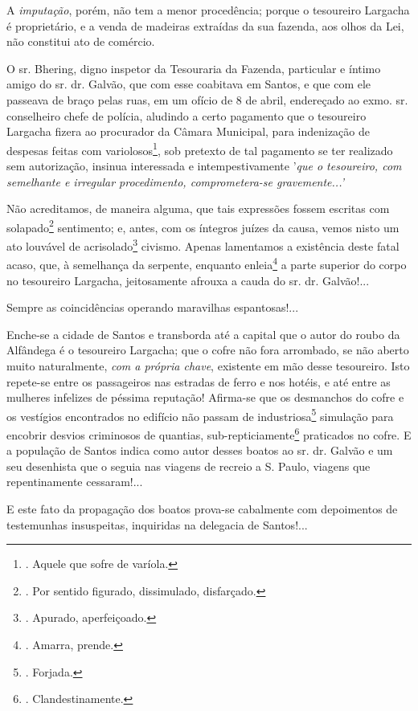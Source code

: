 A \emph{imputação}, porém, não tem a menor procedência; porque o
tesoureiro Largacha é proprietário, e a venda de madeiras extraídas da
sua fazenda, aos olhos da Lei, não constitui ato de comércio.

O sr. Bhering, digno inspetor da Tesouraria da Fazenda, particular e
íntimo amigo do sr. dr. Galvão, que com esse coabitava em Santos, e que
com ele passeava de braço pelas ruas, em um ofício de 8 de abril,
endereçado ao exmo. sr. conselheiro chefe de polícia, aludindo a certo
pagamento que o tesoureiro Largacha fizera ao procurador da Câmara
Municipal, para indenização de despesas feitas com variolosos\footnote{.
  Aquele que sofre de varíola.}, sob pretexto de tal pagamento se ter
realizado sem autorização, insinua interessada e intempestivamente
'\emph{que o tesoureiro, com semelhante e irregular procedimento,
comprometera-se gravemente...'}

Não acreditamos, de maneira alguma, que tais expressões fossem escritas
com solapado\footnote{. Por sentido figurado, dissimulado, disfarçado.}
sentimento; e, antes, com os íntegros juízes da causa, vemos nisto um
ato louvável de acrisolado\footnote{. Apurado, aperfeiçoado.} civismo.
Apenas lamentamos a existência deste fatal acaso, que, à semelhança da
serpente, enquanto enleia\footnote{. Amarra, prende.} a parte superior
do corpo no tesoureiro Largacha, jeitosamente afrouxa a cauda do sr. dr.
Galvão!...

Sempre as coincidências operando maravilhas espantosas!...

Enche-se a cidade de Santos e transborda até a capital que o autor do
roubo da Alfândega é o tesoureiro Largacha; que o cofre não fora
arrombado, se não aberto muito naturalmente, \emph{com a própria chave},
existente em mão desse tesoureiro. Isto repete-se entre os passageiros
nas estradas de ferro e nos hotéis, e até entre as mulheres infelizes de
péssima reputação! Afirma-se que os desmanchos do cofre e os vestígios
encontrados no edifício não passam de industriosa\footnote{. Forjada.}
simulação para encobrir desvios criminosos de quantias,
sub-repticiamente\footnote{. Clandestinamente.} praticados no cofre. E a
população de Santos indica como autor desses boatos ao sr. dr. Galvão e
um seu desenhista que o seguia nas viagens de recreio a S. Paulo,
viagens que repentinamente cessaram!...

E este fato da propagação dos boatos prova-se cabalmente com depoimentos
de testemunhas insuspeitas, inquiridas na delegacia de Santos!...

